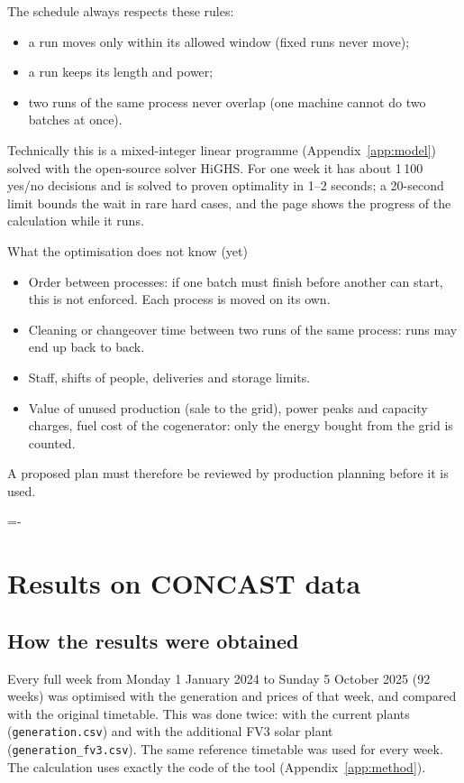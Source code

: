 \documentclass[10pt,a4paper]{scrartcl}
\makeatletter
\renewcommand{\emph}[1]{\textcolor{accent}{#1}}
\newcommand{\NeedSpace}[1]{\par\begingroup\dimen@=\pagegoal\advance\dimen@-\pagetotal
    \ifdim\dimen@<#1\relax\newpage\fi\endgroup}
\newcommand{\RuleSection}[1]{%
    \NeedSpace{10\baselineskip}%
    \section{#1}%
    \vspace{0.2em}{\color{accent!35}\hrule height 0.4pt}\vspace{0.3em}%
  }
\makeatother
\begin{document}
  The schedule always respects these rules:
  \begin{itemize}
    \item a run moves only within its allowed window (fixed runs never move);
    \item a run keeps its length and power;
    \item two runs of the same process never overlap (one machine cannot do two batches at once).
  \end{itemize}

  Technically this is a \emph{mixed-integer linear programme} (Appendix~\ref{app:model}) solved
  with the open-source solver HiGHS. For one week it has about 1\,100 yes/no decisions and is solved
  to proven optimality in 1--2 seconds; a 20-second limit bounds the wait in rare hard cases, and
  the page shows the progress of the calculation while it runs.

  \begin{notebox}{What the optimisation does not know (yet)}
    \begin{itemize}
      \item Order between processes: if one batch must finish before another can start, this is not
        enforced. Each process is moved on its own.
      \item Cleaning or changeover time between two runs of the same process: runs may end up back
        to back.
      \item Staff, shifts of people, deliveries and storage limits.
      \item Value of unused production (sale to the grid), power peaks and capacity charges, fuel
        cost of the cogenerator: only the energy bought from the grid is counted.
    \end{itemize}
    A proposed plan must therefore be reviewed by production planning before it is used.
  \end{notebox}

  \RuleSection{Results on CONCAST data}
  \label{sec:results}

  \subsection{How the results were obtained}

  Every full week from Monday 1 January 2024 to Sunday 5 October 2025 (92 weeks) was optimised
  with the generation and prices of that week, and compared with the original timetable. This was
  done twice: with the current plants (\texttt{generation.csv}) and with the additional FV3 solar
  plant (\texttt{generation\_fv3.csv}). The same reference timetable was used for every week. The
  calculation uses exactly the code of the tool (Appendix~\ref{app:method}).
\end{document}

